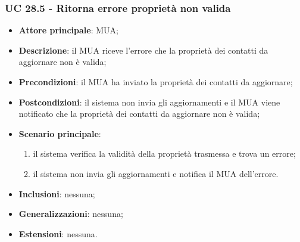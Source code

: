     \subsubsection{UC 28.5 - Ritorna errore proprietà non valida} \label{sec:UC28.5}
    \begin{itemize}
        \item \textbf{Attore principale}: MUA;
        \item \textbf{Descrizione}: il MUA riceve l'errore che la proprietà dei contatti da aggiornare non è valida;
        \item \textbf{Precondizioni}: il MUA ha inviato la proprietà dei contatti da aggiornare;
        \item \textbf{Postcondizioni}: il sistema non invia gli aggiornamenti e il MUA viene notificato che la proprietà dei contatti da aggiornare non è valida;
        \item \textbf{Scenario principale}:
            \begin{enumerate}
                \item il sistema verifica la validità della proprietà trasmessa e trova un errore;
                \item il sistema non invia gli aggiornamenti e notifica il MUA dell'errore.
            \end{enumerate}
        \item \textbf{Inclusioni}: nessuna;
        \item \textbf{Generalizzazioni}: nessuna;
        \item \textbf{Estensioni}: nessuna.
    \end{itemize}